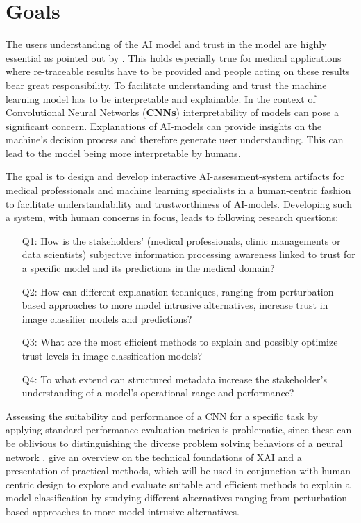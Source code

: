 \documentclass[11pt,a4paper,english]{scrreprt}
\begin{document}
\section{Goals}
The users understanding of the AI model and trust in the model are highly essential as pointed out by \textcite{knapic_explainable_2021}. This holds especially true for medical applications where re-traceable results have to be provided and people acting on these results bear great responsibility. To facilitate understanding and trust the machine learning model has to be interpretable and explainable. In the context of Convolutional Neural Networks (\textbf{CNNs}) interpretability of models can pose a significant concern. Explanations of AI-models can provide insights on the machine's decision process and therefore generate user understanding. This can lead to the model being more interpretable by humans.

The goal is to design and develop interactive AI-assessment-system artifacts for medical professionals and machine learning specialists in a human-centric fashion to facilitate understandability and trustworthiness of AI-models. Developing such a system, with human concerns in focus, leads to following research questions:
\begin{itemize}
    \item[Q1:] How is the stakeholders' (medical professionals, clinic managements or data scientists) subjective information processing awareness linked to trust for a specific model and its predictions in the medical domain?
    \item[Q2:] How can different explanation techniques, ranging from perturbation based approaches to more model intrusive alternatives, increase trust in image classifier models and predictions?
    \item[Q3:] What are the most efficient methods to explain and possibly optimize trust levels in image classification models?
    \item[Q4:] To what extend can structured metadata increase the stakeholder's understanding of a model's operational range and performance?
\end{itemize}

Assessing the suitability and performance of a CNN for a specific task by applying standard performance evaluation metrics is problematic, since these can be oblivious to distinguishing the diverse problem solving behaviors of a neural network \parencite{lapuschkin_unmasking_2019}. \textcite{samek_explaining_2021,JMLR:v17:15-618,ribeiro_anchors_2018} give an overview on the technical foundations of XAI and a presentation of practical methods, which will be used in conjunction with human-centric design to explore and evaluate suitable and efficient methods to explain a model classification by studying different alternatives ranging from perturbation based approaches to more model intrusive alternatives.
\end{document}
